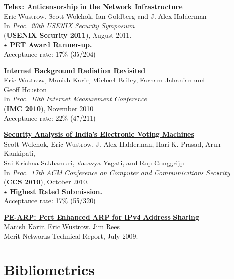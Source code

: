 \documentclass[margin,11pt]{res} %
\begin{document}
    \textbf{\href{https://telex.cc/pub/telex-usenixsec11.pdf}{Telex: Anticensorship in the Network Infrastructure}} \\
    Eric Wustrow, Scott Wolchok, Ian Goldberg and J. Alex Halderman \\
    In \emph{Proc.\ 20th USENIX Security Symposium} \\
    (\textbf{USENIX Security 2011}), August 2011. \\
        \textbf{$\star$ PET Award Runner-up.} \\
    Acceptance rate: 17\% (35/204)

    \textbf{\href{https://ericw.us/trow/imc10-wustrow.pdf}{Internet Background Radiation Revisited}} \\
        Eric Wustrow, Manish Karir, Michael Bailey, Farnam Jahanian and\\ Geoff Houston \\
        In \emph{Proc.\ 10th Internet Measurement Conference} \\
        (\textbf{IMC 2010}), November 2010.\\
        Acceptance rate: 22\% (47/211)

    \textbf{\href{http://www.cse.umich.edu/~jhalderm/pub/papers/evm-ccs10.pdf}{Security Analysis of India's Electronic Voting  Machines}} \\ 
        Scott Wolchok, Eric Wustrow, J. Alex Halderman, Hari K. Prasad, Arun Kankipati, \\
        Sai Krishna Sakhamuri, Vasavya Yagati, and Rop Gonggrijp \\
        In \emph{Proc.\ 17th ACM Conference on Computer and Communications Security} \\
        (\textbf{CCS 2010}), October 2010. \\
        \textbf{$\star$ Highest Rated Submission.} \\
        Acceptance rate: 17\% (55/320)

    \textbf{\href{https://ericw.us/trow/pe-arp.pdf}{PE-ARP: Port Enhanced ARP for IPv4 Address Sharing}} \\
        Manish Karir, Eric Wustrow, Jim Rees \\
        Merit Networks Technical Report, July 2009.

\vspace{6pt}
\section{\large Bibliometrics}
\end{document}

